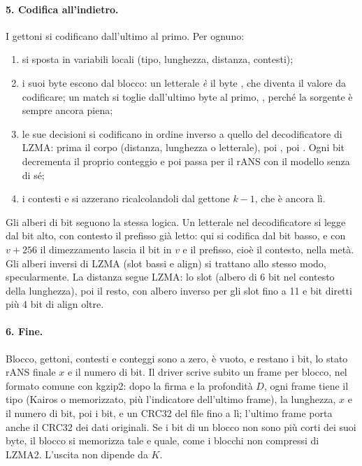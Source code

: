 \paragraph{5. Codifica all'indietro.} I gettoni si codificano dall'ultimo al primo. Per ognuno:
\begin{enumerate}
\item si sposta in variabili locali (tipo, lunghezza, distanza, contesti);
\item i suoi byte escono dal blocco: un letterale \emph{è} il byte , che diventa il valore da codificare; un match si toglie dall'ultimo byte al primo, , perché la sorgente è sempre ancora piena;
\item le sue decisioni si codificano in ordine inverso a quello del decodificatore di LZMA: prima il corpo (distanza, lunghezza o letterale), poi , poi . Ogni bit decrementa il proprio conteggio e poi passa per il rANS con il modello senza di sé;
\item i contesti  e  si azzerano ricalcolandoli dal gettone $k-1$, che è ancora lì.
\end{enumerate}
Gli alberi di bit seguono la stessa logica. Un letterale nel decodificatore si legge dal bit alto, con contesto il prefisso già letto: qui si codifica dal bit basso, e con $v + 256$ il dimezzamento lascia il bit in $v$ e il prefisso, cioè il contesto, nella metà. Gli alberi inversi di LZMA (slot bassi e align) si trattano allo stesso modo, specularmente. La distanza segue LZMA: lo slot (albero di 6 bit nel contesto della lunghezza), poi il resto, con albero inverso per gli slot fino a 11 e bit diretti più 4 bit di align oltre.

\paragraph{6. Fine.} Blocco, gettoni, contesti e conteggi sono a zero,  è vuoto, e restano i bit, lo stato rANS finale $x$ e il numero di bit. Il driver scrive subito un frame per blocco, nel formato comune con kgzip2: dopo la firma  e la profondità $D$, ogni frame tiene il tipo (Kairos o memorizzato, più l'indicatore dell'ultimo frame), la lunghezza, $x$ e il numero di bit, poi i bit, e un CRC32 del file fino a lì; l'ultimo frame porta anche il CRC32 dei dati originali. Se i bit di un blocco non sono più corti dei suoi byte, il blocco si memorizza tale e quale, come i blocchi non compressi di LZMA2. L'uscita non dipende da $K$.


